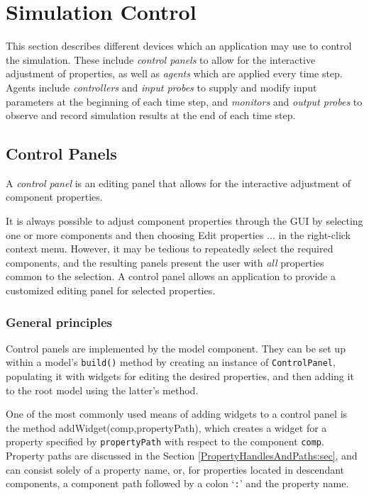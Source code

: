 
\section{Simulation Control}
\label{SimulationControl:sec}

This section describes different devices which an application may use
to control the simulation. These include {\it control panels} to allow
for the interactive adjustment of properties, as well as {\it agents}
which are applied every time step. Agents include {\it controllers}
and {\it input probes} to supply and modify input parameters at the
beginning of each time step, and {\it monitors} and {\it output
probes} to observe and record simulation results at the end of each
time step.

\subsection{Control Panels}
\label{ControlPanels:sec}

A {\it control panel} is an editing panel that allows for the
interactive adjustment of component properties.

It is always possible to adjust component properties through the GUI
by selecting one or more components and then choosing {\sf Edit
properties ...} in the right-click context menu. However, it may be
tedious to repeatedly select the required components, and the
resulting panels present the user with {\it all} properties common to
the selection.  A control panel allows an application to provide a
customized editing panel for selected properties.

\subsubsection{General principles}

Control panels are implemented by the
 model component.  They
can be set up within a model's {\tt build()} method by creating an
instance of {\tt ControlPanel}, populating it with widgets for editing
the desired properties, and then adding it to the root model using the
latter's
method.

One of the most commonly used means of adding widgets to a control
panel is the method
%
{addWidget(comp,propertyPath)}, which creates a widget for a property
specified by {\tt propertyPath} with respect to the component
{\tt comp}.  Property paths are discussed in the Section
\ref{PropertyHandlesAndPaths:sec}, and can consist solely of a
property name, or, for properties located in descendant components, a
component path followed by a colon `{\tt :}' and the property name.

